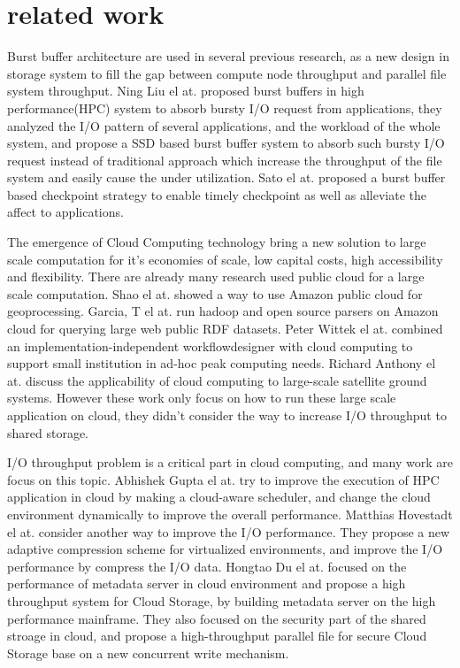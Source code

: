 \section{related work}
\label{sec:related work}

Burst buffer architecture are used in several previous research, as a new design in storage system
to fill the gap between compute node throughput and parallel file system throughput.
Ning Liu el at. \cite{on_the_role_of_burst_buffers} proposed burst buffers in high
performance(HPC) system to absorb bursty I/O request from applications, they analyzed the I/O
pattern of several applications, and the workload of the whole system, and propose a SSD based burst
buffer system to absorb such bursty I/O request instead of traditional approach which increase the
throughput of the file system and easily cause the under utilization.
Sato el at.\cite{checkpointing} proposed a burst buffer based checkpoint strategy to enable timely
checkpoint as well as alleviate the affect to applications.

The emergence of Cloud Computing technology bring a new solution to large scale computation for it's
economies of scale, low capital costs, high accessibility and flexibility.
There are already many research used public cloud for a large scale computation.
Shao el at.\cite{Geoprocessing_on_the_Amazon_cloud_computing_platform} showed a way to use Amazon
public cloud for geoprocessing.
Garcia, T el at.\cite{Analysis_of_Big_Data_Technologies_and_Method} run hadoop and open source
parsers on Amazon cloud for querying large web public RDF datasets.
Peter Wittek el at.\cite{XML_Processing_in_the_Cloud} combined an implementation-independent
workflowdesigner with cloud computing to support small institution in ad-hoc peak computing needs.
Richard Anthony el at.\cite{Cloud_computing_applications_for_large-scale_satellite_ground_systems}
discuss the applicability of cloud computing to large-scale satellite ground 
systems.
However these work only focus on how to run these large scale application on cloud, they didn't
consider the way to increase I/O throughput to shared storage.

I/O throughput problem is a critical part in cloud computing, and many work are focus on this
topic.
Abhishek Gupta el at.\cite{Towards_Efficient_Mapping} try to improve the execution of HPC
application in cloud by making a cloud-aware scheduler, and change the cloud environment
dynamically to improve the overall performance.
Matthias Hovestadt el at.\cite{Evaluating_Adaptive_Compression} consider another way to improve the
I/O performance.
They propose a new adaptive compression scheme for virtualized environments, and improve the I/O
performance by compress the I/O data.
Hongtao Du el at.\cite{DHFS:_A_High-Throughput_Heterogeneous_File_System_Based_on_Mainframe_for_Cloud_Storage}
focused on the performance of metadata server in cloud environment and propose a high throughput
system for Cloud Storage, by building metadata server on the high performance mainframe.
They also focused on the security part of the shared stroage in cloud, and propose a
high-throughput parallel file for secure Cloud Storage base on a new concurrent write
mechanism\cite{PsFS:_A_high-throughput_parallel_file_system_for_secure_Cloud_Storage_system}.
